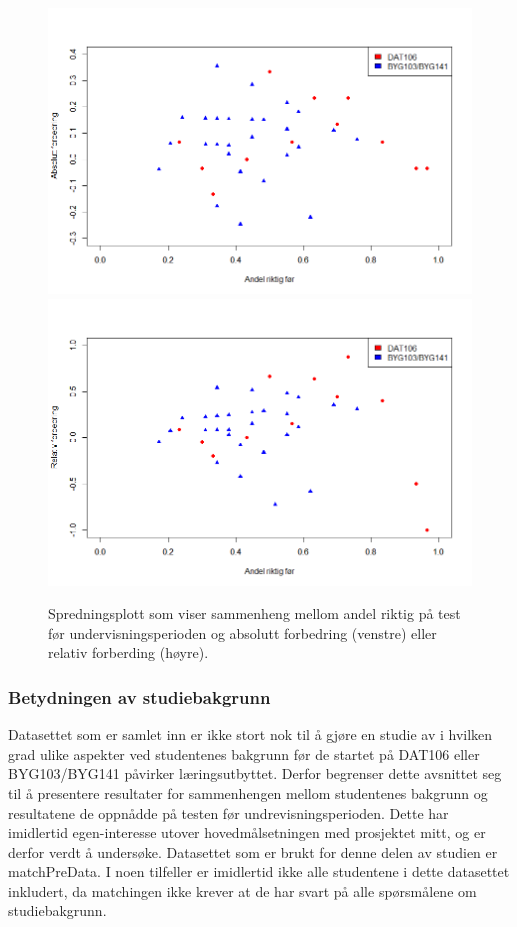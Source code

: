 \documentclass[a4paper,norsk,12pt]{article}
\begin{document}
\begin{figure}[tp]
	\includegraphics[width=.48\textwidth]{./absoluttForbedringScatter}
	\includegraphics[width=.48\textwidth]{./relativForbedringScatter}
	\caption{Spredningsplott som viser sammenheng mellom andel riktig på test før undervisningsperioden og absolutt forbedring (venstre) eller relativ forberding (høyre).}
	\label{fig:scatter}
\end{figure}

\subsubsection{Betydningen av studiebakgrunn}
Datasettet som er samlet inn er ikke stort nok til å gjøre en studie av i hvilken grad ulike aspekter ved studentenes bakgrunn før de startet på DAT106 eller BYG103/BYG141 påvirker læringsutbyttet. Derfor begrenser dette avsnittet seg til å presentere resultater for sammenhengen mellom studentenes bakgrunn og resultatene de oppnådde på testen før undrevisningsperioden. Dette har imidlertid egen-interesse utover hovedmålsetningen med prosjektet mitt, og er derfor verdt å undersøke. Datasettet som er brukt for denne delen av studien er matchPreData. I noen tilfeller er imidlertid ikke alle studentene i dette datasettet inkludert, da matchingen ikke krever at de har svart på alle spørsmålene om studiebakgrunn.
\end{document}
